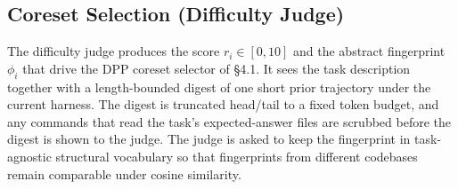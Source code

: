 \subsection{Coreset Selection (Difficulty Judge)}

The difficulty judge produces the score $r_i \in [0, 10]$ and the
abstract fingerprint $\phi_i$ that drive the DPP coreset selector of
\S 4.1. It sees the task description together with a length-bounded
digest of one short prior trajectory under the current harness. The
digest is truncated head/tail to a fixed token budget, and any
commands that read the task's expected-answer files are scrubbed
before the digest is shown to the judge. The judge is asked to keep
the fingerprint in task-agnostic structural vocabulary so that
fingerprints from different codebases remain comparable under cosine
similarity.


